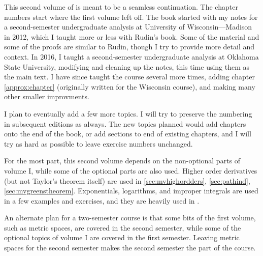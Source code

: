 
This second volume of  is meant to
be a seamless continuation.  The chapter numbers start where the
first volume left off.  The book started with my notes for a second-semester
undergraduate analysis at University of Wisconsin---Madison in 2012, which
I taught more or less with Rudin's book.  Some of the
material and some of the proofs are similar to Rudin, though I try
to provide more detail and context.
In 2016, I taught a second-semester
undergraduate analysis at Oklahoma State University, modifying
and cleaning up the notes, this time using them as the main text.
I have since taught the course several more times, adding chapter
\ref{approx:chapter} (originally written for the Wisconsin course),
and making many other smaller improvments.

I plan to eventually add a few more topics.
I will try to preserve the numbering in subsequent editions as always.
The new topics planned would add chapters onto the end of the
book, or add sections to end of existing chapters, and I will try as hard as
possible to leave exercise numbers unchanged.

For the most part, this second volume
depends on the non-optional parts of volume I\@,
while some of the optional parts are also used.
Higher order derivatives (but not Taylor's theorem
itself) are used
in \ref{sec:mvhighordders}, \ref{sec:pathind},
\ref{sec:mvgreenstheorem}.  Exponentials, logarithms, and improper integrals are
used in a few examples and exercises, and they are heavily used in
.

An alternate plan for a
two-semester course is that some bits of the
first volume, such as metric spaces, are
covered in the second semester, while some of the optional topics of volume
I are covered in the first semester.  Leaving metric spaces for the second
semester makes the second
semester the  part of the course.

